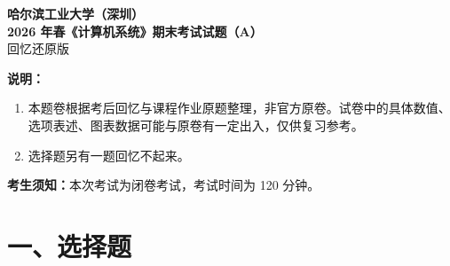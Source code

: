 \documentclass[11pt,a4paper]{ctexart}
\title{}
\author{}
\date{}
\begin{document}
\begin{center}
  {\LARGE\bfseries 哈尔滨工业大学（深圳）}\\[0.6em]
  {\Large\bfseries 2026 年春《计算机系统》期末考试试题（A）}\\[0.3em]
  {\large 回忆还原版}
\end{center}

\vspace{0.4em}
\noindent\textbf{说明：}
\begin{enumerate}[leftmargin=1.5em,itemsep=0.15em,topsep=0.2em]
  \item 本题卷根据考后回忆与课程作业原题整理，非官方原卷。试卷中的具体数值、选项表述、图表数据可能与原卷有一定出入，仅供复习参考。
  \item 选择题另有一题回忆不起来。
\end{enumerate}

\noindent\textbf{考生须知：}本次考试为闭卷考试，考试时间为 120 分钟。

\vspace{0.6em}
\section*{一、选择题}
\end{document}
